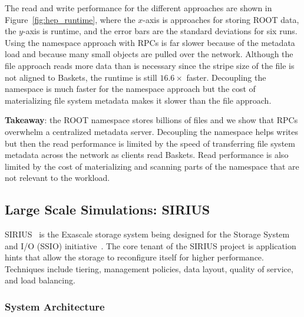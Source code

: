 The read and write performance for the different approaches are shown in
Figure~\ref{fig:hep_runtime}, where the \(x\)-axis is approaches for storing
ROOT data, the \(y\)-axis is runtime, and the error bars are the standard
deviations for six runs. Using the namespace approach with RPCs is far slower
because of the metadata load and because many small objects are pulled over the
network. Although the file approach reads more data than is necessary since the
stripe size of the file is not aligned to Baskets, the runtime is still
\(16.6\times\) faster. Decoupling the namespace is much faster for the
namespace approach but the cost of materializing file system metadata makes it
slower than the file approach. 


\textbf{Takeaway}: the ROOT namespace stores billions of files and we show that
RPCs overwhelm a centralized metadata server. Decoupling the namespace helps
writes but then the read performance is limited by the speed of transferring
file system metadata across the network as clients read Baskets.  Read
performance is also limited by the cost of materializing and scanning parts of
the namespace that are not relevant to the workload.

\subsection{Large Scale Simulations: SIRIUS}

SIRIUS~\cite{klasky:journal16-sirius} is the Exascale storage system being
designed for the Storage System and I/O (SSIO)
initiative~\cite{ross:report14-ssio}. The core tenant of the SIRIUS project is
application hints that allow the storage to reconfigure itself for higher
performance. Techniques include tiering, management policies, data layout,
quality of service, and load balancing. 

\subsubsection{System Architecture}

